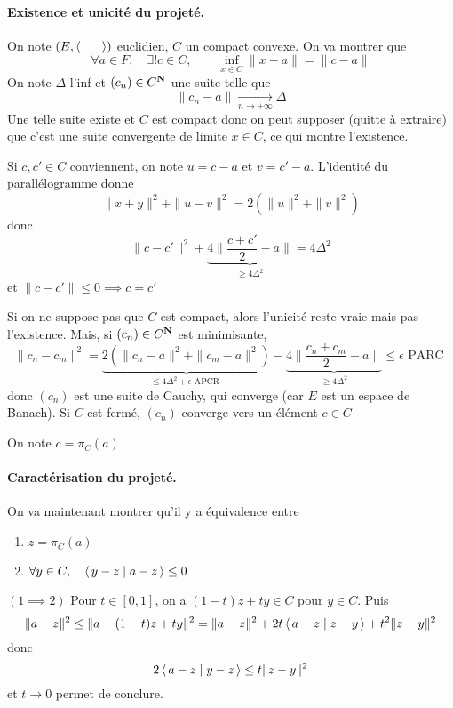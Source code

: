\paragraph{Existence et unicité du projeté.}
On note $(E, \scalar{\;}{\;} )$ euclidien, $C$ un compact convexe. On va montrer que  \[
\forall  a \in  F, \quad  \exists  ! c \in  C, \qquad  \inf_{x \in  C}\|x-a\|=\|c-a\|
\] 
On note $\Delta$ l'inf et  $(c_n) \in  C^{\mathbf N}$ une suite telle que \[
\|c_n-a\| \xrightarrow[n\to+\infty]{}\Delta
\] 
Une telle suite existe et $C$ est compact donc on peut supposer (quitte à extraire) que c'est une suite convergente de limite  $x \in  C$, ce qui montre l'existence.

Si $c, c' \in  C$ conviennent, on note $u=c-a$ et  $v=c'-a$. L'identité du parallélogramme donne  \[
    \|x+y\|^2 + \|u-v\|^2 =2(\|u\|^2 + \|v\|^2 )
\] 
donc \[
    \|c-c'\|^2 +\underbrace{4 \|\frac{c+c'}{2}-a\|}_{\geq 4\Delta^2}=4\Delta^2
\] 
et $\|c-c'\|\leq 0 \implies c=c'$

\begin{rem}
    Si on ne suppose pas que $C$ est compact, alors l'unicité reste vraie mais pas l'existence. Mais, si  $(c_n) \in  C^{\mathbf N}$ est minimisante, \[
        \|c_n-c_m\|^2 =\underbrace{2(\|c_n-a\|^2 +\|c_m-a\|^2 )}_{\leq 4\Delta^2+\epsilon \text{ APCR }}-\underbrace{4 \|\frac{c_n+c_m}{2}-a\|}_{\geq 4\Delta^2} \leq \epsilon\text{ PARC }
    \] 
    donc $(c_n)$ est une suite de Cauchy, qui converge (car $E$ est un espace de Banach). Si $C$ est fermé,  $(c_n)$ converge vers un élément  $c \in  C$
\end{rem}

\begin{notation}
    On note $c=\pi_C(a)$
\end{notation}

\paragraph{Caractérisation du projeté.}
On va maintenant montrer qu'il y a équivalence entre \begin{enumerate}
    \item $z=\pi_C(a)$
    \item $\forall  y \in  C, \quad  \scalar{y-z}{a-z} \leq 0$
\end{enumerate}

$(1\implies 2)$ Pour $t \in  [0, 1]$, on a $(1-t)z+ty \in  C$ pour $y \in  C$. Puis \[
    \|a-z\|^2 \leq \|a-(1-t)z+ty\|^2 =\|a-z\|^2 +2t \scalar{a-z}{z-y} +t^2 \|z-y\|^2 
\] 
donc \[
2 \scalar{a-z}{y-z} \leq t \|z-y\|^2 
\] 
et $t \to  0$ permet de conclure.

